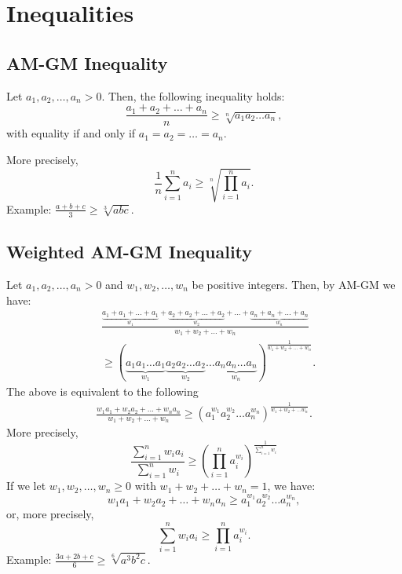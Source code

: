 \documentclass[a4paper,11pt]{article}
\begin{document}
\section{Inequalities}


\subsection{AM-GM Inequality}
\begin{tcolorbox}[breakable]
    Let $a_1, a_2, \dots, a_n >0$. Then, the following inequality holds:
    \[
    \frac{a_1 + a_2 + \dots + a_n}{n} \geq \sqrt[n]{a_1 a_2 \dots a_n},
    \]
    with equality if and only if $a_1 = a_2 = \dots = a_n$.

    More precisely,
    \[
    \frac{1}{n} \sum_{i=1}^n a_i \geq \sqrt[n]{\prod_{i=1}^n a_i}.
    \]
    Example: $\textstyle \frac{a + b + c}{3} \geq \sqrt[3]{abc}$.
\end{tcolorbox}


\subsection{Weighted AM-GM Inequality}
\begin{tcolorbox}[breakable]
    Let $a_1, a_2, \dots, a_n > 0$ and $w_1, w_2, \dots, w_n$ be positive integers. Then, by AM-GM we have:
    \begin{align*}
        &\frac{\underbrace{a_1 + a_1 + \dots + a_1}_{w_1} + \underbrace{a_2 + a_2 + \dots + a_2}_{w_2} + \dots + \underbrace{a_n + a_n + \dots + a_n}_{w_n}}{w_1 + w_2 + \dots + w_n} \\
        &\geq \left( \underbrace{a_1 a_1 \dots a_1}_{w_1} \underbrace{a_2 a_2 \dots a_2}_{w_2} \dots \underbrace{a_n a_n \dots a_n}_{w_n} \right)^{\frac{1}{w_1 + w_2 + \dots + w_n}}.
    \end{align*}
    The above is equivalent to the following
    \begin{align*}
        \frac{w_1 a_1 + w_2 a_2 + \dots + w_n a_n}{w_1 + w_2 + \dots + w_n} \geq (a_1^{w_1} a_2^{w_2} \dots a_n^{w_n})^\frac{1}{w_1 + w_2 + \dots w_n}.
    \end{align*}
    More precisely,
    \[
    \frac{\sum_{i=1}^n w_i a_i}{\sum_{i=1}^n w_i} \geq \left( \prod_{i=1}^n a_i^{w_i} \right)^{\frac{1}{\sum_{i=1}^n w_i}}
    \]
    If we let $w_1, w_2, \dots, w_n \geq 0$ with $w_1 + w_2 + \dots + w_n = 1$, we have:
    \[
    w_1a_1 + w_2a_2 + \dots + w_na_n \geq a_1^{w_1} a_2^{w_2} \dots a_n^{w_n},
    \]
    or, more precisely,
    \[
    \sum_{i=1}^n w_ia_i \geq \prod_{i=1}^n a_i^{w_i}.
    \]
    Example: $\textstyle \frac{3a + 2b + c}{6} \geq \sqrt[6]{a^3 b^2 c}$.
\end{tcolorbox}
\end{document}
